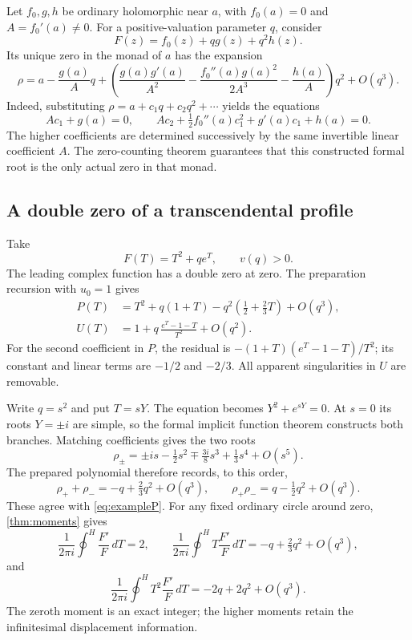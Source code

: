 \documentclass[11pt,a4paper]{article}
\numberwithin{equation}{section}
\theoremstyle{definition}
\newcommand{\hoint}{\oint^{\!H}}
\begin{document}
Let $f_0,g,h$ be ordinary holomorphic near $a$, with $f_0(a)=0$ and
$A=f_0'(a)\neq0$. For a positive-valuation parameter $q$, consider
\[
 F(z)=f_0(z)+qg(z)+q^2h(z).
\]
Its unique zero in the monad of $a$ has the expansion
\begin{equation}\label{eq:simplemotion}
 \rho=a-\frac{g(a)}Aq+
 \left(
 \frac{g(a)g'(a)}{A^2}
 -\frac{f_0''(a)g(a)^2}{2A^3}
 -\frac{h(a)}A
 \right)q^2+O(q^3).
\end{equation}
Indeed, substituting $\rho=a+c_1q+c_2q^2+\cdots$ yields the equations
\[
 Ac_1+g(a)=0,\qquad
 Ac_2+\tfrac12f_0''(a)c_1^2+g'(a)c_1+h(a)=0.
\]
The higher coefficients are determined successively by the same invertible
linear coefficient $A$. The zero-counting theorem guarantees that this
constructed formal root is the only actual zero in that monad.

\subsection{A double zero of a transcendental profile}
\label{subsec:doubleexample}

Take
\[
 F(T)=T^2+q e^T,\qquad v(q)>0.
\]
The leading complex function has a double zero at zero. The preparation
recursion with $u_0=1$ gives
\begin{align}
 P(T)&=T^2+q(1+T)-q^2\left(\tfrac12+\tfrac23T\right)+O(q^3),
       \label{eq:exampleP}\\
 U(T)&=1+q\,\frac{e^T-1-T}{T^2}+O(q^2).
       \label{eq:exampleU}
\end{align}
For the second coefficient in $P$, the residual is
$-(1+T)(e^T-1-T)/T^2$; its constant and linear terms are $-1/2$ and $-2/3$.
All apparent singularities in $U$ are removable.

Write $q=s^2$ and put $T=sY$. The equation becomes
$Y^2+e^{sY}=0$. At $s=0$ its roots $Y=\pm i$ are simple, so the formal
implicit function theorem constructs both branches. Matching coefficients
gives the two roots
\begin{equation}\label{eq:doubleroots}
 \rho_\pm=\pm is-\tfrac12s^2\mp\tfrac{3i}{8}s^3
                 +\tfrac13s^4+O(s^5).
\end{equation}
The prepared polynomial therefore records, to this order,
\[
 \rho_++\rho_-=-q+\tfrac23q^2+O(q^3),\qquad
 \rho_+\rho_-=q-\tfrac12q^2+O(q^3).
\]
These agree with \eqref{eq:exampleP}. For any fixed ordinary circle around
zero, \cref{thm:moments} gives
\[
 \frac1{2\pi i}\hoint \frac{F'}F\,dT=2,\qquad
 \frac1{2\pi i}\hoint T\frac{F'}F\,dT=-q+\tfrac23q^2+O(q^3),
\]
and
\[
 \frac1{2\pi i}\hoint T^2\frac{F'}F\,dT=-2q+2q^2+O(q^3).
\]
The zeroth moment is an exact integer; the higher moments retain the
infinitesimal displacement information.
\end{document}
